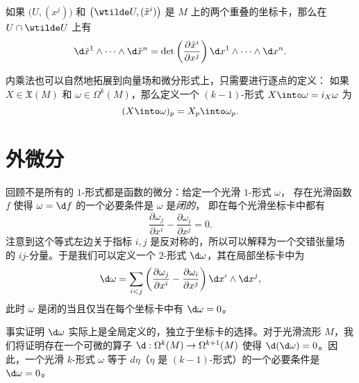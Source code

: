 \begin{corollary}
  如果 $\bigl(U,(x^j)\bigr)$ 和 $\bigl(\wtilde U,(\tilde x^i)\bigr)$ 是 $M$
  上的两个重叠的坐标卡，那么在 $U\cap\wtilde U$ 上有
  \begin{equation}
    \d \tilde x^1\wedge\cdots\wedge \d \tilde x^n=
    \det\left(\frac{\partial\tilde x^i}{\partial x^j}\right) 
    \d x^1\wedge\cdots\wedge \d x^n.
  \end{equation}
\end{corollary}

内乘法也可以自然地拓展到向量场和微分形式上，只需要进行逐点的定义：
如果 $X\in \mathfrak{X}(M)$ 和 $\omega\in \Omega^k(M)$，那么定义一个
$(k-1)$-形式 $X\into\omega=i_X \omega$ 为
\[
  (X\into \omega)_p=X_p\into \omega_p.
\]



\section{外微分}

回顾不是所有的 $1$-形式都是函数的微分：给定一个光滑 $1$-形式 $\omega$，
存在光滑函数 $f$ 使得 $\omega=\d f$ 的一个必要条件是 $\omega$ 是\emph{闭的}，
即在每个光滑坐标卡中都有
\begin{equation}
  \frac{\partial\omega_j}{\partial x^i}-\frac{\partial\omega_i}{\partial x^j}=0.
\end{equation}
注意到这个等式左边关于指标 $i,j$ 是反对称的，所以可以解释为一个交错张量场
的 $ij$-分量。于是我们可以定义一个 $2$-形式 $\d\omega$，其在局部坐标卡中为
\begin{equation}
  \d\omega=\sum_{i<j}\left(\frac{\partial\omega_j}{\partial x^i}-\frac{\partial\omega_i}{\partial x^j}\right)
  \d x^i\wedge\d x^j,
\end{equation}
此时 $\omega$ 是闭的当且仅当在每个坐标卡中有 $\d\omega=0$。

事实证明 $\d\omega$ 实际上是全局定义的，独立于坐标卡的选择。对于光滑流形
$M$，我们将证明存在一个可微的算子 $\d:\Omega^k(M)\to\Omega^{k+1}(M)$
使得 $\d(\d\omega)=0$。因此，一个光滑 $k$-形式 $\omega$ 等于 $d\eta$（$\eta$ 是
$(k-1)$-形式）的一个必要条件是 $\d\omega=0$。

